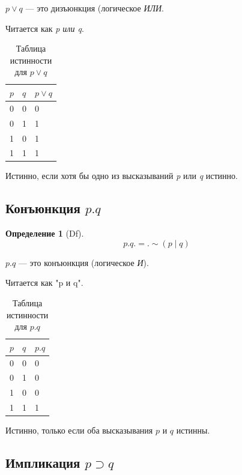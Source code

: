 \documentclass[a4paper, 12pt]{article}
\newtheorem{definition}{Определение}
\begin{document}
$p \vee q$ — это дизъюнкция (логическое \textit{ИЛИ}.

Читается как \textit{p или q}.

\begin{table}[h]
    \centering
    \caption{Таблица истинности для $p \vee q$}
    \label{tab:equalwidth}
    \begin{tabularx}{\textwidth}{|X|X|X|}
        \hline
        \textbf{$p$} & \textbf{$q$} & \textbf{$p \vee q$}\\
        \hline
        0 & 0 & 0 \\
        \hline
        0 & 1 & 1 \\
        \hline
        1 & 0 & 1 \\
        \hline
        1 & 1 & 1 \\
        \hline
    \end{tabularx}
\end{table}

Истинно, если хотя бы одно из высказываний \textit{p} или \textit{q} истинно.

\subsection{Конъюнкция $p.q$}

\begin{definition}[Df]
    \[
       p.q .=. \sim (p \mid q) 
    \]
\end{definition}

$p.q$ — это конъюнкция (логическое \textit{И}).

Читается как "p и q".

\begin{table}[h]
    \centering
    \caption{Таблица истинности для $p.q$}
    \label{tab:equalwidth}
    \begin{tabularx}{\textwidth}{|X|X|X|}
        \hline
        \textbf{$p$} & \textbf{$q$} & \textbf{$p.q$}\\
        \hline
        0 & 0 & 0 \\
        \hline
        0 & 1 & 0 \\
        \hline
        1 & 0 & 0 \\
        \hline
        1 & 1 & 1 \\
        \hline
    \end{tabularx}
\end{table}

Истинно, только если оба высказывания $p$ и $q$ истинны.

\subsection{Импликация $p \supset q$}
\end{document}
